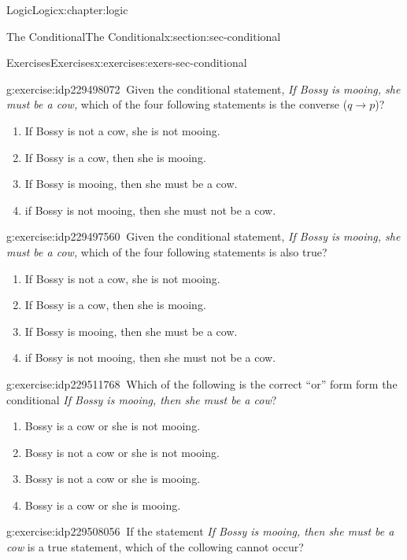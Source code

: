 \documentclass[twoside,10pt,]{book}
\numberwithin{equation}{section}
\newcommand{\converse}{{q {\rightarrow} p}}
\begin{document}
\begin{chapterptx}{Logic}{}{Logic}{}{}{x:chapter:logic}
\begin{sectionptx}{The Conditional}{}{The Conditional}{}{}{x:section:sec-conditional}
\begin{exercises-subsection}{Exercises}{}{Exercises}{}{}{x:exercises:exers-sec-conditional}
\begin{divisionexercise}{28}{}{}{g:exercise:idp229498072}%
\(\ \)Given the conditional statement, \emph{If Bossy is mooing, she must be a cow,} which of the four following statements is the converse (\(\converse\))? %
\begin{enumerate}[label=(\alph*)]
\item{}If Bossy is not a cow, she is not mooing.%
\item{}If Bossy is a cow, then she is mooing.%
\item{}If Bossy is mooing, then she must be a cow.%
\item{}if Bossy is not mooing, then she must not be a cow.%
\end{enumerate}
\end{divisionexercise}%
\begin{divisionexercise}{29}{}{}{g:exercise:idp229497560}%
\(\ \)Given the conditional statement, \emph{If Bossy is mooing, she must be a cow,} which of the four following statements is also true? %
\begin{enumerate}[label=(\alph*)]
\item{}If Bossy is not a cow, she is not mooing.%
\item{}If Bossy is a cow, then she is mooing.%
\item{}If Bossy is mooing, then she must be a cow.%
\item{}if Bossy is not mooing, then she must not be a cow.%
\end{enumerate}
\end{divisionexercise}%
\begin{divisionexercise}{30}{}{}{g:exercise:idp229511768}%
\(\ \)Which of the following is the correct ``or'' form form the conditional \emph{If Bossy is mooing, then she must be a cow}? %
\begin{enumerate}[label=(\alph*)]
\item{}Bossy is a cow or she is not mooing.%
\item{}Bossy is not a cow or she is not mooing.%
\item{}Bossy is not a cow or she is mooing.%
\item{}Bossy is a cow or she is mooing.%
\end{enumerate}
\end{divisionexercise}%
\begin{divisionexercise}{31}{}{}{g:exercise:idp229508056}%
\(\ \)If the statement \emph{If Bossy is mooing, then she must be a cow} is a true statement, which of the collowing cannot occur? %

\end{divisionexercise}
\end{exercises-subsection}
\end{sectionptx}
\end{chapterptx}
\end{document}
